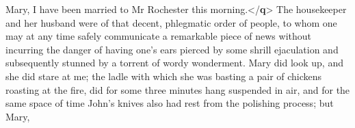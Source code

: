 \documentclass[11pt,twoside]{article}\makeatletter
\begin{document}
\begin{shaded}
\mbox{}\newline 
\hspace*{6pt}Mary, I have been married to Mr Rochester this\mbox{}\newline 
\hspace*{6pt}\hspace*{6pt}\hspace*{6pt}\hspace*{6pt} morning.{</\textbf{q}>} The housekeeper and her husband were of that\mbox{}\newline 
\hspace*{6pt}\hspace*{6pt} decent, phlegmatic order of people, to whom one may at any\mbox{}\newline 
\hspace*{6pt}\hspace*{6pt} time safely communicate a remarkable piece of news without\mbox{}\newline 
\hspace*{6pt}\hspace*{6pt} incurring the danger of having one's ears pierced by some\mbox{}\newline 
\hspace*{6pt}\hspace*{6pt} shrill ejaculation and subsequently stunned by a torrent of\mbox{}\newline 
\hspace*{6pt}\hspace*{6pt} wordy wonderment. Mary did look up, and she did stare at\mbox{}\newline 
\hspace*{6pt}\hspace*{6pt} me; the ladle with which she was basting a pair of chickens\mbox{}\newline 
\hspace*{6pt}\hspace*{6pt} roasting at the fire, did for some three minutes hang\mbox{}\newline 
\hspace*{6pt}\hspace*{6pt} suspended in air, and for the same space of time John's\mbox{}\newline 
\hspace*{6pt}\hspace*{6pt} knives also had rest from the polishing process; but Mary,\mbox{}\newline 

\end{shaded}
\end{document}
